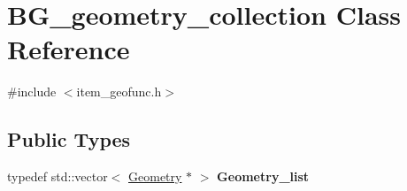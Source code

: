 \hypertarget{classBG__geometry__collection}{}\section{B\+G\+\_\+geometry\+\_\+collection Class Reference}
\label{classBG__geometry__collection}


{\ttfamily \#include $<$item\+\_\+geofunc.\+h$>$}

\subsection*{Public Types}
\begin{DoxyCompactItemize}
\item 
\mbox{\label{classBG__geometry__collection_a38170b1445cbeac05c141e37b5d68651}} 
typedef std\+::vector$<$ \mbox{\hyperlink{classGeometry}{Geometry}} $\ast$ $>$ {\bfseries Geometry\+\_\+list}
\end{DoxyCompactItemize}
